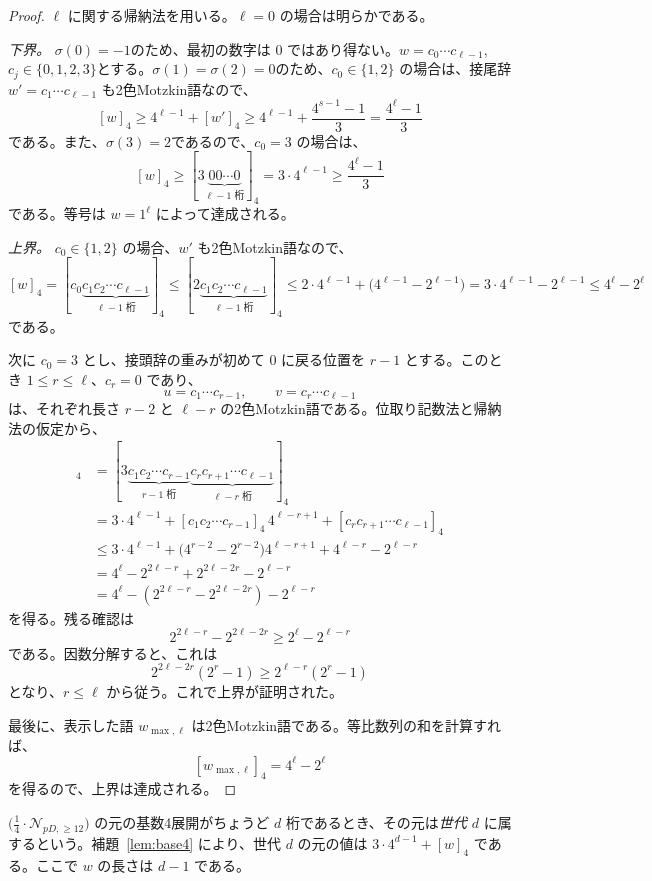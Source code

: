 \documentclass[12pt]{ltjsarticle}
\theoremstyle{plain}
\theoremstyle{definition}
\theoremstyle{plain}
\newcommand{\Pset}{
  \bigl(\tfrac{1}{4}\cdot\mathcal{N}_{pD,\geq 12}\bigr)
}
\begin{document}
\begin{proof}
$\ell$ に関する帰納法を用いる。$\ell=0$ の場合は明らかである。

\emph{下界。}
$\sigma(0)=-1$のため、最初の数字は $0$ ではあり得ない。$w=c_0\cdots c_{\ell-1}$, $c_j\in\{0,1,2,3\}$とする。$\sigma(1)=\sigma(2)=0$のため、$c_0\in\{1,2\}$ の場合は、接尾辞 $w'=c_1\cdots c_{\ell-1}$ も2色Motzkin語なので、
\[
  [w]_4\geq4^{\ell-1}+[w']_4
  \geq4^{\ell-1}+\frac{4^{s-1}-1}{3}
  =\frac{4^{\ell}-1}{3}
\]
である。また、$\sigma(3)=2$であるので、$c_0=3$ の場合は、
\[
  [w]_4\geq [3\underbrace{00\cdots0}_{\ell-1\text{ 桁}}]_4=3\cdot4^{\ell-1}\geq\frac{4^{\ell}-1}{3}
\]
である。等号は $w=1^{\ell}$ によって達成される。

\emph{上界。}
$c_0\in\{1,2\}$ の場合、$w'$ も2色Motzkin語なので、
\[
  [w]_4
  =[c_0\underbrace{c_1c_2\cdots c_{\ell-1}}_{\ell-1\text{ 桁}}]_4\leq[2\underbrace{c_1c_2\cdots c_{\ell-1}}_{\ell-1\text{ 桁}}]_4\leq2\cdot4^{\ell-1}+\bigl(4^{\ell-1}-2^{\ell-1}\bigr)
  =3\cdot4^{\ell-1}-2^{\ell-1}
  \leq4^{\ell}-2^{\ell}
\]
である。

次に $c_0=3$ とし、接頭辞の重みが初めて $0$ に戻る位置を $r-1$ とする。このとき $1\leq r\leq\ell$、$c_r=0$ であり、
\[
  u=c_1\cdots c_{r-1},\qquad v=c_{r}\cdots c_{\ell-1}
\]
は、それぞれ長さ $r-2$ と $\ell-r$ の2色Motzkin語である。位取り記数法と帰納法の仮定から、
\begin{align*}
  [w]_4
  &=[3\underbrace{c_1c_2\cdots c_{r-1}}_{r-1\text{ 桁}}\underbrace{c_{r}c_{r+1}\cdots c_{\ell-1}}_{\ell-r\text{ 桁}}]_4\\
  &=3\cdot4^{\ell-1}+[c_1c_2\cdots c_{r-1}]_4\,4^{\ell-r+1}+[c_{r}c_{r+1}\cdots c_{\ell-1}]_4\\
  &\leq3\cdot4^{\ell-1}
    +\bigl(4^{r-2}-2^{r-2}\bigr)4^{\ell-r+1}
    +4^{\ell-r}-2^{\ell-r}\\
  &=4^{\ell}-2^{2\ell-r}+2^{2\ell-2r}-2^{\ell-r}\\
    &=4^{\ell}-(2^{2\ell-r}-2^{2\ell-2r})-2^{\ell-r}
\end{align*}
を得る。残る確認は
\[
  2^{2\ell-r}-2^{2\ell-2r}
  \geq2^{\ell}-2^{\ell-r}
\]
である。因数分解すると、これは
\[
  2^{2\ell-2r}(2^r-1)\geq2^{\ell-r}(2^r-1)
\]
となり、$r\leq\ell$ から従う。これで上界が証明された。

最後に、表示した語 $w_{\max,\ell}$ は2色Motzkin語である。等比数列の和を計算すれば、
\[
  [w_{\max,\ell}]_4=4^{\ell}-2^{\ell}
\]
を得るので、上界は達成される。
\end{proof}

$\Pset$ の元の基数4展開がちょうど $d$ 桁であるとき、その元は\emph{世代 $d$} に属するという。補題~\ref{lem:base4} により、世代 $d$ の元の値は $3\cdot4^{d-1}+[w]_4$ である。ここで $w$ の長さは $d-1$ である。
\end{document}
